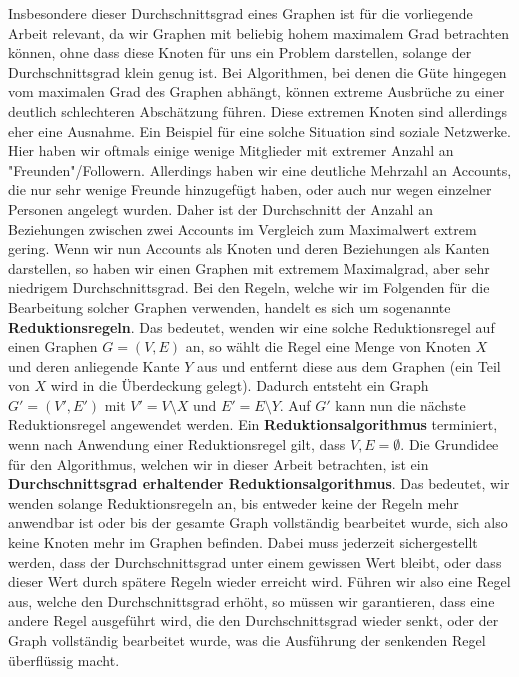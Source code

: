 \documentclass[12pt,onecolumn, notitlepage]{scrartcl}
\begin{document}
Insbesondere dieser Durchschnittsgrad eines Graphen ist für die vorliegende Arbeit relevant, da wir Graphen mit beliebig hohem maximalem Grad betrachten können, ohne dass diese Knoten für uns ein Problem darstellen, solange der Durchschnittsgrad klein genug ist. Bei Algorithmen, bei denen die Güte hingegen vom maximalen Grad des Graphen abhängt, können extreme Ausbrüche zu einer deutlich schlechteren Abschätzung führen. Diese extremen Knoten sind allerdings eher eine Ausnahme. Ein Beispiel für eine solche Situation sind soziale Netzwerke. Hier haben wir oftmals einige wenige Mitglieder mit extremer Anzahl an "Freunden"/Followern. Allerdings haben wir eine deutliche Mehrzahl an Accounts, die nur sehr wenige Freunde hinzugefügt haben, oder auch nur wegen einzelner Personen angelegt wurden. Daher ist der Durchschnitt der Anzahl an Beziehungen zwischen zwei Accounts im Vergleich zum Maximalwert extrem gering. Wenn wir nun Accounts als Knoten und deren Beziehungen als Kanten darstellen, so haben wir einen Graphen mit extremem Maximalgrad, aber sehr niedrigem Durchschnittsgrad.\newline
Bei den Regeln, welche wir im Folgenden für die Bearbeitung solcher Graphen verwenden, handelt es sich um sogenannte \textbf{Reduktionsregeln}. Das bedeutet, wenden wir eine solche Reduktionsregel auf einen Graphen $G = (V,E)$ an, so wählt die Regel eine Menge von Knoten $X$ und deren anliegende Kante $Y$ aus und entfernt diese aus dem Graphen (ein Teil von $X$ wird in die Überdeckung gelegt). Dadurch entsteht ein Graph $G' = (V',E')$ mit $V' = V \setminus X$ und $E' = E \setminus Y$. Auf $G'$ kann nun die nächste Reduktionsregel angewendet werden. Ein \textbf{Reduktionsalgorithmus} terminiert, wenn nach Anwendung einer Reduktionsregel gilt, dass $V,E = \emptyset$. \newline
Die Grundidee für den Algorithmus, welchen wir in dieser Arbeit betrachten, ist ein \textbf{Durchschnittsgrad erhaltender Reduktionsalgorithmus}. Das bedeutet, wir wenden solange Reduktionsregeln an, bis entweder keine der Regeln mehr anwendbar ist oder bis der gesamte Graph vollständig bearbeitet wurde, sich also keine Knoten mehr im Graphen befinden. Dabei muss jederzeit sichergestellt werden, dass der Durchschnittsgrad unter einem gewissen Wert bleibt, oder dass dieser Wert durch spätere Regeln wieder erreicht wird. Führen wir also eine Regel aus, welche den Durchschnittsgrad erhöht, so müssen wir garantieren, dass eine andere Regel ausgeführt wird, die den Durchschnittsgrad wieder senkt, oder der Graph vollständig bearbeitet wurde, was die Ausführung der senkenden Regel überflüssig macht. \newline\newline
\end{document}
